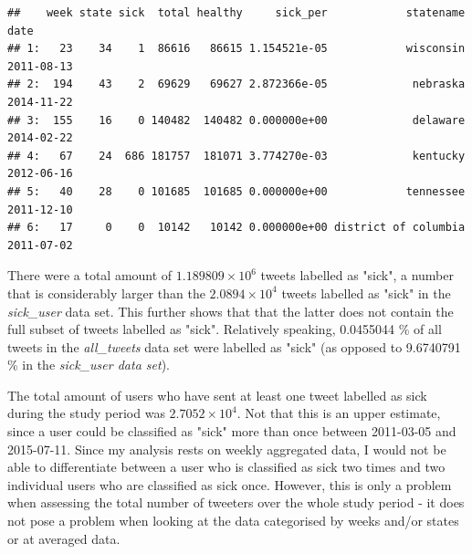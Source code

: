 \documentclass[11pt, a4paper]{article}\usepackage[]{graphicx}\usepackage[]{color}
\makeatletter
\newenvironment{kframe}{%
 \def\at@end@of@kframe{}%
 \ifinner\ifhmode%
  \def\at@end@of@kframe{\end{minipage}}%
  \begin{minipage}{\columnwidth}%
 \fi\fi%
 \def\FrameCommand##1{\hskip\@totalleftmargin \hskip-\fboxsep
 \colorbox{shadecolor}{##1}\hskip-\fboxsep
     \hskip-\linewidth \hskip-\@totalleftmargin \hskip\columnwidth}%
 \MakeFramed {\advance\hsize-\width
   \@totalleftmargin\z@ \linewidth\hsize
   \@setminipage}}%
 {\par\unskip\endMakeFramed%
 \at@end@of@kframe}
\newenvironment{knitrout}{}{} %
\makeatother
\begin{document}
\begin{knitrout}
\color{fgcolor}\begin{kframe}
\begin{verbatim}
##    week state sick  total healthy     sick_per            statename       date
## 1:   23    34    1  86616   86615 1.154521e-05            wisconsin 2011-08-13
## 2:  194    43    2  69629   69627 2.872366e-05             nebraska 2014-11-22
## 3:  155    16    0 140482  140482 0.000000e+00             delaware 2014-02-22
## 4:   67    24  686 181757  181071 3.774270e-03             kentucky 2012-06-16
## 5:   40    28    0 101685  101685 0.000000e+00            tennessee 2011-12-10
## 6:   17     0    0  10142   10142 0.000000e+00 district of columbia 2011-07-02
\end{verbatim}
\end{kframe}
\end{knitrout}

There were a total amount of \ensuremath{1.189809\times 10^{6}} tweets labelled as "sick", a number that is considerably larger than the \ensuremath{2.0894\times 10^{4}} tweets labelled as "sick" in the \textit{sick\_user} data set. This further shows that that the latter does not contain the full subset of tweets labelled as "sick". Relatively speaking, 0.0455044 \% of all tweets in the \textit{all\_tweets} data set were labelled as "sick" (as opposed to 9.6740791 \% in the \textit{sick\_user data set}).\newline

The total amount of users who have sent at least one tweet labelled as sick during the study period was \ensuremath{2.7052\times 10^{4}}. Not that this is an upper estimate, since a user could be classified as "sick" more than once between 2011-03-05 and 2015-07-11. Since my analysis rests on weekly aggregated data, I would not be able to differentiate between a user who is classified as sick two times and two individual users who are classified as sick once. However, this is only a problem when assessing the total number of tweeters over the whole study period - it does not pose a problem when looking at the data categorised by weeks and/or states or at averaged data.\newline
\end{document}
